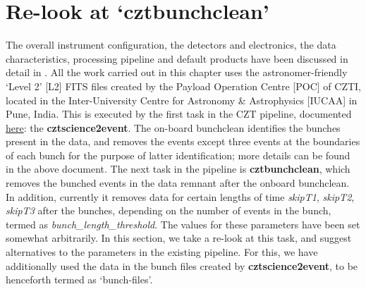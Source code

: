\section{Re-look at `cztbunchclean'}
\label{sec:Bunchclean}
The overall instrument configuration, the detectors and electronics, the data characteristics, processing pipeline and default products have been discussed in detail in \cite{Bhalerao_et_al.-2017-JApA}. All the work carried out in this chapter uses the astronomer-friendly `Level 2' [L2] FITS files created by the Payload Operation Centre [POC] of CZTI, located in the Inter-University Centre for Astronomy \& Astrophysics [IUCAA] in Pune, India. This is executed by the first task in the CZT pipeline, documented \href{http://astrosat-ssc.iucaa.in/uploads/czti/CZTI_level2_software_userguide_V2.1.pdf}{here}: the  \textbf{cztscience2event}. The on-board bunchclean identifies the bunches present in the data, and removes the events except three events at the boundaries of each bunch for the purpose of latter identification; more details can be found in the above document. The next task in the pipeline is \textbf{cztbunchclean}, which removes the bunched events in the data remnant after the onboard bunchclean. In addition, currently it removes data for certain lengths of time \emph{skipT1}, \emph{skipT2}, \emph{skipT3} after the bunches, depending on the number of events in the bunch, termed as \emph{bunch\_length\_threshold}. The values for these parameters have been set somewhat arbitrarily. In this section, we take a re-look at this task, and suggest alternatives to the parameters in the existing pipeline. For this, we have additionally used the data in the bunch files created by \textbf{cztscience2event}, to be henceforth termed as `bunch-files'.

